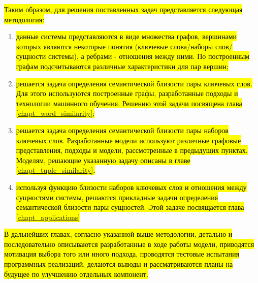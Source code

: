 
\hl{Таким образом, для решения поставленных задач представляется следующая методология:}

\begin{enumerate}
    \item \hl{данные системы представляются в виде множества графов, вершинами которых являются некоторые понятия (ключевые слова/наборы слов/сущности системы), а ребрами - отношения между ними. По построенным графам подсчитываются различные характеристики для пар вершин;}
    \item \hl{решается задача определения семантической близости пары ключевых слов. Для этого используются построенные графы, разработанные подходы и технологии машинного обучения. Решению этой задачи посвящена глава \ref{chapt_word_similarity};}
    \item \hl{решается задача определения семантической близости пары наборов ключевых слов. Разработанные модели используют различные графовые представления, подходы и модели, рассмотренные в предыдущих пунктах. Моделям, решающие указанную задачу описаны в главе \ref{chapt_tuple_similarity}.}
    \item \hl{используя функцию близости наборов ключевых слов и отношения между сущностями системы, решаются прикладные задачи определения семантической близости пары сущностей. Этой задаче посвящается глава \ref{chapt_applications}}
\end{enumerate}

\hl{В дальнейших главах, согласно указанной выше методологии, детально и последовательно описываются разработанные в ходе работы модели, приводятся мотивация выбора того или иного подхода, проводятся тестовые испытания программных реализаций, делаются выводы и рассматриваются планы на будущее по улучшению отдельных компонент.}





